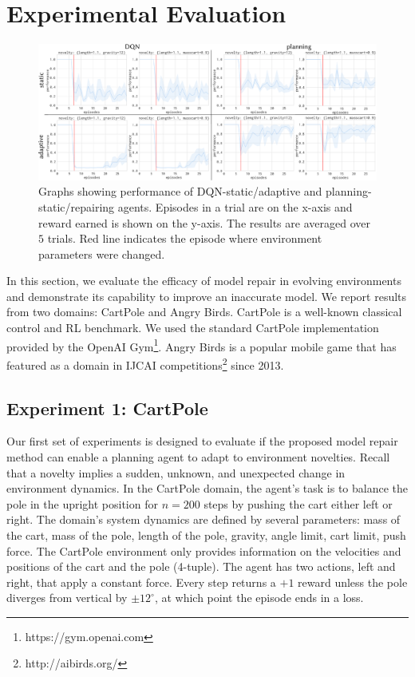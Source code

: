 \documentclass[letterpaper]{article} %
\begin{document}
\section{Experimental Evaluation}
\begin{figure}
    \centering
    \includegraphics[width=1\textwidth]{figures/experiments/combined.pdf}
    \caption{Graphs showing performance of DQN-static/adaptive and planning-static/repairing agents. Episodes in a trial are on the x-axis and reward earned is shown on the y-axis. The results are averaged over $5$ trials. Red line indicates the episode where environment parameters were changed.}
    \label{fig:combined_results}
\end{figure}
In this section, we evaluate the efficacy of model repair in evolving environments and demonstrate its capability to improve an inaccurate model. We report results from two domains: CartPole and Angry Birds. CartPole is a well-known classical control and RL benchmark. We used the standard CartPole implementation provided by the OpenAI Gym\footnote{https://gym.openai.com}. Angry Birds is a popular mobile game that has featured as a domain in IJCAI competitions\footnote{http://aibirds.org/} since 2013. 

\subsection{Experiment 1: CartPole}
Our first set of experiments is designed to evaluate if the proposed model repair method can enable a planning agent to adapt to environment novelties. Recall that a novelty implies a sudden, unknown, and unexpected change in environment dynamics. In the CartPole domain, the agent's task is to balance the pole in the upright position for $n=200$ steps by pushing the cart either left or right. The domain's system dynamics are defined by several parameters: mass of the cart, mass of the pole, length of the pole, gravity, angle limit, cart limit, push force. The CartPole environment only provides information on the velocities and positions of the cart and the pole (4-tuple). The agent has two actions, left and right, that apply a constant force. Every step returns a $+1$ reward unless the pole diverges from vertical by $\pm 12^{\circ}$, at which point the episode ends in a loss. 
\end{document}
